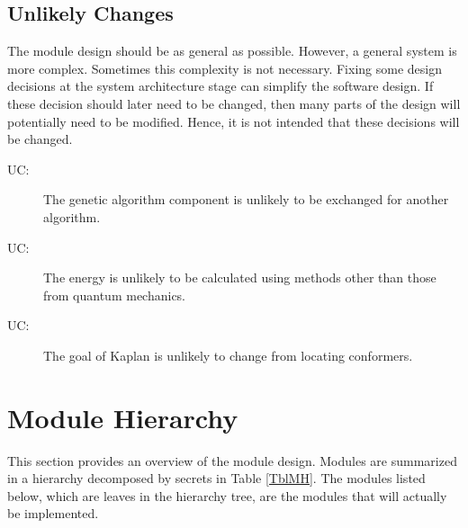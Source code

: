\documentclass[12pt, titlepage]{article}
\newcounter{ucnum}
\newcommand{\uctheucnum}{UC\theucnum}
\newcommand{\progname}{Kaplan} %
\begin{document}

\subsection{Unlikely Changes} \label{SecUchange}

The module design should be as general as possible. However, a general system is
more complex. Sometimes this complexity is not necessary. Fixing some design
decisions at the system architecture stage can simplify the software design. If
these decision should later need to be changed, then many parts of the design
will potentially need to be modified. Hence, it is not intended that these
decisions will be changed.

\begin{description}
\item[ \uctheucnum \label{ucGA}:] The genetic algorithm 
component is unlikely to be exchanged for another algorithm.
\item[ \uctheucnum \label{ucEnery}:] The energy is 
unlikely to be calculated using methods other than those from quantum mechanics.
\item[ \uctheucnum \label{ucgoal}:] The goal of 
\progname{} is unlikely to change from locating conformers.
\end{description}

\section{Module Hierarchy} \label{SecMH}

This section provides an overview of the module design. Modules are summarized
in a hierarchy decomposed by secrets in Table \ref{TblMH}. The modules listed
below, which are leaves in the hierarchy tree, are the modules that will
actually be implemented.
\end{document}
